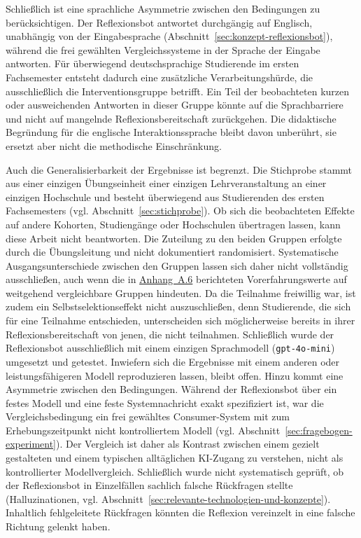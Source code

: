 Schließlich ist eine sprachliche Asymmetrie zwischen den Bedingungen zu berücksichtigen. Der
Reflexionsbot antwortet durchgängig auf Englisch, unabhängig von der Eingabesprache
(Abschnitt~\ref{sec:konzept-reflexionsbot}), während die frei gewählten Vergleichssysteme in der
Sprache der Eingabe antworten. Für überwiegend deutschsprachige Studierende im ersten Fachsemester
entsteht dadurch eine zusätzliche Verarbeitungshürde, die ausschließlich die Interventionsgruppe
betrifft. Ein Teil der beobachteten kurzen oder ausweichenden Antworten in dieser Gruppe könnte auf
die Sprachbarriere und nicht auf mangelnde Reflexionsbereitschaft zurückgehen. Die didaktische
Begründung für die englische Interaktionssprache bleibt davon unberührt, sie ersetzt aber nicht die
methodische Einschränkung.

Auch die Generalisierbarkeit der Ergebnisse ist begrenzt. Die Stichprobe stammt aus einer einzigen
Übungseinheit einer einzigen Lehrveranstaltung an einer einzigen Hochschule und besteht überwiegend
aus Studierenden des ersten Fachsemesters (vgl. Abschnitt~\ref{sec:stichprobe}). Ob sich die
beobachteten Effekte auf andere Kohorten, Studiengänge oder Hochschulen übertragen lassen, kann diese
Arbeit nicht beantworten. Die Zuteilung zu den beiden Gruppen erfolgte durch die Übungsleitung und
nicht dokumentiert randomisiert. Systematische Ausgangsunterschiede zwischen den Gruppen lassen sich
daher nicht vollständig ausschließen, auch wenn die in \hyperref[app:statistik]{Anhang~A.6} berichteten Vorerfahrungswerte auf
weitgehend vergleichbare Gruppen hindeuten. Da die Teilnahme freiwillig war, ist zudem ein
Selbstselektionseffekt nicht auszuschließen, denn Studierende, die sich für eine Teilnahme entschieden, unterscheiden sich möglicherweise
bereits in ihrer Reflexionsbereitschaft von jenen, die nicht teilnahmen. Schließlich wurde der
Reflexionsbot ausschließlich mit einem einzigen Sprachmodell (\texttt{gpt-4o-mini}) umgesetzt und
getestet. Inwiefern sich die Ergebnisse mit einem anderen oder leistungsfähigeren Modell reproduzieren
lassen, bleibt offen. Hinzu kommt eine Asymmetrie zwischen den Bedingungen. Während der Reflexionsbot
über ein festes Modell und eine feste Systemnachricht exakt spezifiziert ist, war die
Vergleichsbedingung ein frei gewähltes Consumer-System mit zum Erhebungszeitpunkt nicht
kontrolliertem Modell (vgl. Abschnitt~\ref{sec:fragebogen-experiment}). Der Vergleich ist daher als
Kontrast zwischen einem gezielt gestalteten und einem typischen alltäglichen KI-Zugang zu verstehen,
nicht als kontrollierter Modellvergleich. Schließlich wurde nicht systematisch geprüft, ob der
Reflexionsbot in Einzelfällen sachlich falsche Rückfragen stellte (Halluzinationen, vgl.
Abschnitt~\ref{sec:relevante-technologien-und-konzepte}). Inhaltlich fehlgeleitete Rückfragen könnten
die Reflexion vereinzelt in eine falsche Richtung gelenkt haben.

